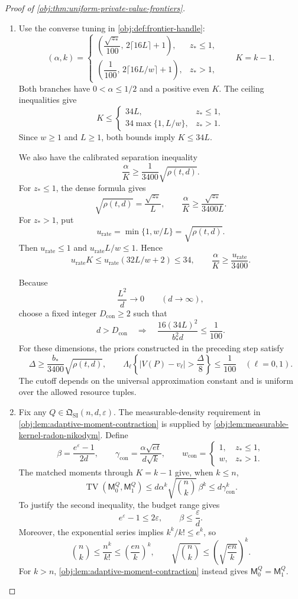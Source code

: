 \documentclass[11pt]{article}
\begin{document}
\begin{proof}[Proof of \cref{obj:thm:uniform-private-value-frontiers}]
\begin{enumerate}
\item
Use the converse tuning in \cref{obj:def:frontier-handle}:
\[
(\alpha,k)=
\begin{cases}
\left(\dfrac{\sqrt{z_*}}{100},\,2\lceil16L\rceil+1\right),
&z_*\le1,\\[3pt]
\left(\dfrac1{100},\,2\lceil16L/w\rceil+1\right),
&z_*>1,
\end{cases}
\qquad K=k-1.
\]
Both branches have \(0<\alpha\le1/2\) and a positive even \(K\).
The ceiling inequalities give
\[
K\le
\begin{cases}
34L,&z_*\le1,\\
34\max\{1,L/w\},&z_*>1.
\end{cases}
\]
Since \(w\ge1\) and \(L\ge1\), both bounds imply \(K\le34L\).

We also have the calibrated separation inequality
\[
\frac{\alpha}{K}\ge\frac1{3400}\sqrt{\rho(t,d)}.
\]
For \(z_*\le1\), the dense formula gives
\[
\sqrt{\rho(t,d)}=\frac{\sqrt{z_*}}{L},
\qquad
\frac{\alpha}{K}
\ge\frac{\sqrt{z_*}}{3400L}.
\]
For \(z_*>1\), put
\[
u_{\mathrm{rate}}=\min\{1,w/L\}=\sqrt{\rho(t,d)}.
\]
Then \(u_{\mathrm{rate}}\le1\) and
\(u_{\mathrm{rate}}L/w\le1\). Hence
\[
u_{\mathrm{rate}}K
\le u_{\mathrm{rate}}(32L/w+2)\le34,
\qquad
\frac{\alpha}{K}\ge\frac{u_{\mathrm{rate}}}{3400}.
\]

Because
\[
\frac{L^2}{d}\longrightarrow0\qquad(d\longrightarrow\infty),
\]
choose a fixed integer \(D_{\mathrm{con}}\ge2\) such that
\[
d>D_{\mathrm{con}}
\quad\Longrightarrow\quad
\frac{16(34L)^2}{b_*^2d}\le\frac1{100}.
\]
For these dimensions, the priors constructed in the preceding step satisfy
\[
\Delta\ge\frac{b_*}{3400}\sqrt{\rho(t,d)},
\qquad
\Lambda_\ell\!\left\{|V(P)-v_\ell|>\frac{\Delta}{8}\right\}
\le\frac1{100}
\quad(\ell=0,1).
\]
The cutoff depends on the universal approximation constant and is uniform over the allowed resource tuples.

\item
Fix any \(Q\in\mathfrak Q_{\mathrm{SI}}(n,d,\varepsilon)\). The measurable-density requirement in \cref{obj:lem:adaptive-moment-contraction} is supplied by \cref{obj:lem:measurable-kernel-radon-nikodym}. Define
\[
\beta=\frac{e^\varepsilon-1}{2d},
\qquad
\gamma_{\mathrm{con}}
=\frac{\alpha\sqrt{et}}{d\sqrt{k}},
\qquad
w_{\mathrm{con}}=
\begin{cases}
1,&z_*\le1,\\
w,&z_*>1.
\end{cases}
\]
The matched moments through \(K=k-1\) give, when \(k\le n\),
\[
\operatorname{TV}(\mathsf M_0^Q,\mathsf M_1^Q)
\le d\alpha^k\sqrt{\binom nk}\,\beta^k
\le d\gamma_{\mathrm{con}}^k.
\]
To justify the second inequality, the budget range gives
\[
e^\varepsilon-1\le2\varepsilon,
\qquad \beta\le\frac{\varepsilon}{d}.
\]
Moreover, the exponential series implies \(k^k/k!\le e^k\), so
\[
\binom nk\le\frac{n^k}{k!}\le\left(\frac{en}{k}\right)^k,
\qquad
\sqrt{\binom nk}\le\left(\sqrt{\frac{en}{k}}\right)^k.
\]
For \(k>n\), \cref{obj:lem:adaptive-moment-contraction} instead gives
\(\mathsf M_0^Q=\mathsf M_1^Q\).


\end{enumerate}
\end{proof}
\end{document}
